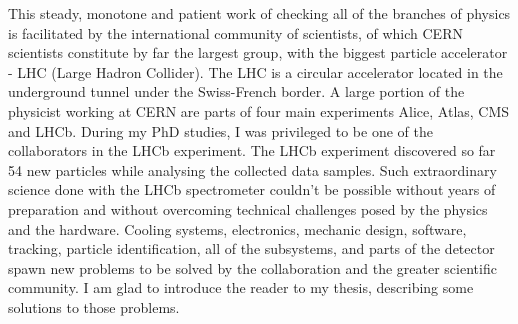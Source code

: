 This steady, monotone and patient work of checking all of the branches of physics is facilitated by the international community of scientists, of which CERN scientists constitute by far the largest group, with the biggest particle accelerator - LHC (Large Hadron Collider).
The LHC is a circular accelerator located in the underground tunnel under the Swiss-French border.
A large portion of the physicist working at CERN are parts of four main experiments Alice, Atlas, CMS and LHCb.
During my PhD studies, I was privileged to be one of the collaborators in the LHCb experiment.
The LHCb experiment discovered so far 54 new particles while analysing the collected data samples.
Such extraordinary science done with the LHCb spectrometer couldn't be possible without years of preparation and without overcoming technical challenges posed by the physics and the hardware.
Cooling systems, electronics, mechanic design, software, tracking, particle identification, all of the subsystems, and parts of the detector spawn new problems to be solved by the collaboration and the greater scientific community.
I am glad to introduce the reader to my thesis, describing some solutions to those problems.
